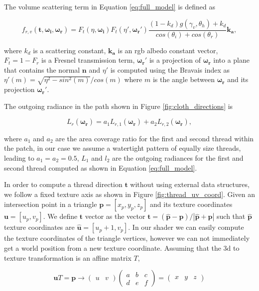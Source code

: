 \documentclass[12pt]{article}
\begin{document}
The volume scattering term in Equation \ref{eq:full_model} is defined as

\begin{equation}
f_{r,v}(\mathbf{t},\boldsymbol{\omega_i},\boldsymbol{\omega_r}) = F_t(\eta, \boldsymbol{\omega_i}) F_t(\eta', \boldsymbol{\omega_r}') \frac{(1-k_d)g(\gamma_v, \theta_h)+k_d}{cos(\theta_i) + cos(\theta_r)} \mathbf{k_a},
\end{equation}

where $k_d$ is a scattering constant, $\mathbf{k_a}$ is an rgb albedo constant vector, $F_t = 1 - F_r$ is a Fresnel transmission term, $\boldsymbol{\omega_r}'$ is a projection of $\boldsymbol{\omega_r}$ into a plane that contains the normal $\mathbf{n}$ and $\eta'$ is computed using the Bravais index \cite{Marschner2003} as $\eta'(m) = \sqrt{\eta^2 - sin^2(m)}  / cos(m)$ where $m$ is the angle between $\boldsymbol{\omega_r}$ and its projection $\boldsymbol{\omega_r}'$.

The outgoing radiance in the path shown in Figure \ref{fig:cloth_directions} is

\begin{equation}
L_r(\boldsymbol{\omega_r}) = a_1 L_{r,1}(\boldsymbol{\omega_r}) + a_2 L_{r,2}(\boldsymbol{\omega_r}),
\end{equation}

where $a_1$ and $a_2$ are the area coverage ratio for the first and second thread within the patch, in our case we assume a watertight pattern of equally size threads, leading to $a_1 = a_2 = 0.5$, $L_1$ and $l_2$ are the outgoing radiances for the first and second thread computed as shown in Equation \ref{eq:full_model}.

In order to compute a thread direction $\mathbf{t}$ without using external data structures, we follow a fixed texture axis as shown in Figure \ref{fig:thread_uv_coord}.
Given an intersection point in a triangle $\mathbf{p} = \left[ x_p, y_p,z_p \right]$ and its texture coordinates $\mathbf{u} = \left[ u_p, v_p \right]$.
We define $\mathbf{t}$ vector as the vector $\mathbf{t} = (\hat{\mathbf{p}} - \mathbf{p})/ \left|\hat{\mathbf{p}} + \mathbf{p} \right|$ such that $\hat{\mathbf{p}}$ texture coordinates are $\hat{\mathbf{u}} = \left[ u_p + 1, v_p \right]$.
In our shader we can easily compute the texture coordinates of the triangle vertices, however we can not immediately get a world position from a new texture coordinate.
Assuming that the 3d to texture transformation is an affine matrix $T$,

\begin{equation}
\mathbf{u} T = \mathbf{p} \rightarrow
\begin{pmatrix}
u & v
\end{pmatrix}
\begin{pmatrix}
a & b & c \\
d & e & f
\end{pmatrix} =
\begin{pmatrix}
x & y & z
\end{pmatrix}
\label{eq:uv_to_3d}
\end{equation}
\end{document}
